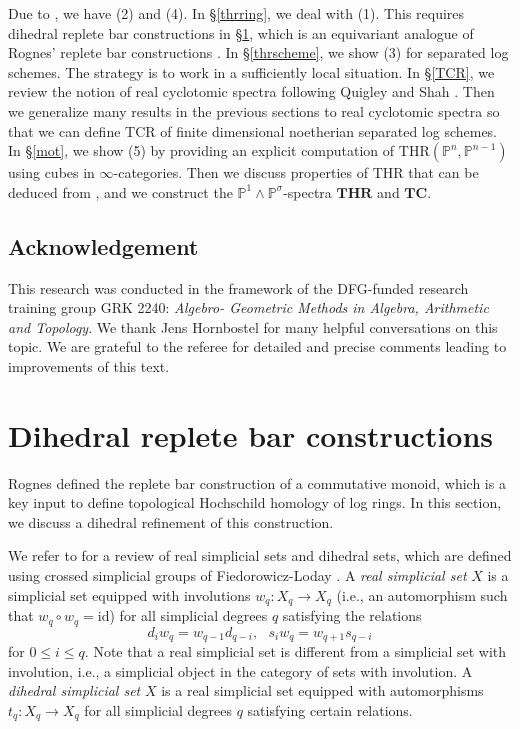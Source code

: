 \documentclass[10pt]{amsart}
\theoremstyle{definition}
\theoremstyle{remark}
\numberwithin{equation}{section}
\renewcommand{\P}{\mathbb{P}}
\newcommand{\id}{\mathrm{id}}
\newcommand{\THR}{\mathrm{THR}}
\newcommand{\TCR}{\mathrm{TCR}}
\newcommand{\bTC}{\mathbf{TC}}
\newcommand{\bTHR}{\mathbf{THR}}
\begin{document}
Due to \cite{THR},
we have (2) and (4).
In \S \ref{thrring},
we deal with (1).
This requires dihedral replete bar constructions in \S \ref{dih},
which is an equivariant analogue of Rognes' replete bar constructions \cite[Definition 3.16]{Rog09}.
In \S \ref{thrscheme},
we show (3) for separated log schemes.
The strategy is to work in a sufficiently local situation.
In \S \ref{TCR},
we review the notion of real cyclotomic spectra following Quigley and Shah \cite{QS2}.
Then we generalize many results in the previous sections to real cyclotomic spectra so that we can define $\TCR$ of finite dimensional noetherian separated log schemes.
In \S \ref{mot},
we show (5) by providing an explicit computation of $\THR(\P^n,\P^{n-1})$ using cubes in $\infty$-categories.
Then we discuss properties of $\THR$ that can be deduced from \cite{logSH},
and we construct the $\P^1\wedge \P^\sigma$-spectra $\bTHR$ and $\bTC$.

\subsection*{Acknowledgement}
This research was conducted in the framework of the DFG-funded research training group GRK 2240: \emph{Algebro-
Geometric Methods in Algebra, Arithmetic and Topology}.
We thank Jens Hornbostel for many helpful conversations on this topic.
We are grateful to the referee for detailed and precise comments leading to improvements of this text.

\section{Dihedral replete bar constructions}
\label{dih}

Rognes \cite[Definition 3.16]{Rog09} defined the replete bar construction of a commutative monoid,
which is a key input to define topological Hochschild homology of log rings.
In this section,
we discuss a dihedral refinement of this construction.


We refer to \cite[Example 4.1.3]{THR} for a review of real simplicial sets and dihedral sets,
which are defined using crossed simplicial groups of Fiedorowicz-Loday \cite{FL}.
A \emph{real simplicial set} $X$ is a simplicial set equipped with involutions $w_q\colon X_q \to X_q$ (i.e., an automorphism such that $w_q\circ w_q=\id$) for all simplicial degrees $q$ satisfying
the relations
\[
d_iw_{q}=w_{q-1}d_{q-i},
\text{ }
s_iw_q=w_{q+1}s_{q-i}
\]
for $0\leq i\leq q$.
Note that a real simplicial set is different from a simplicial set with involution, i.e., a simplicial object in the category of sets with involution.
A \emph{dihedral simplicial set} $X$ is a real simplicial set equipped with automorphisms $t_q\colon X_q\to X_q$ for all simplicial degrees $q$ satisfying certain relations.
\end{document}
